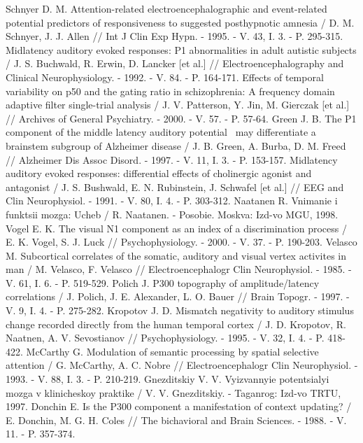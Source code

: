 \documentclass[twocolumn]{article}
\begin{document}
\begin{thebibliography}{35}
Schnyer D. M. Attention-related electroencephalographic and event-related potential predictors of responsiveness to suggested posthypnotic amnesia / D. M. Schnyer, J. J. Allen  // Int J Clin Exp Hypn. - 1995. - V. 43, I. 3. - P. 295-315.
Midlatency auditory evoked responses: P1 abnormalities in adult autistic subjects / J. S. Buchwald, R. Erwin, D. Lancker [et al.] // Electroencephalography and Clinical Neurophysiology. - 1992. - V. 84. - P. 164-171.
Effects of temporal variability on p50 and the gating ratio in schizophrenia: A frequency domain adaptive filter single-trial analysis / J. V. Patterson, Y. Jin, M. Gierczak [et al.] // Archives of General Psychiatry. - 2000. - V. 57. - P. 57-64.
Green J. B. The P1 component of the middle latency auditory potential  may differentiate a brainstem subgroup of Alzheimer disease / J. B. Green, A. Burba, D. M. Freed // Alzheimer Dis Assoc Disord. - 1997. - V. 11, I. 3. - P. 153-157.
Midlatency auditory evoked responses: differential effects of cholinergic agonist and antagonist / J. S. Bushwald, E. N. Rubinstein, J. Schwafel [et al.] // EEG and Clin Neurophysiol. - 1991. - V. 80, I. 4. - P. 303-312.
Naatanen R. Vnimanie i funktsii mozga: Ucheb / R. Naatanen. - Posobie. Moskva: Izd-vo MGU, 1998.
Vogel E. K. The visual N1 component as an index of a discrimination process / E. K. Vogel, S. J. Luck  // Psychophysiology. - 2000. - V. 37. - P. 190-203.
Velasco M. Subcortical correlates of the somatic, auditory and visual vertex activites in man / M. Velasco, F. Velasco  // Electroencephalogr Clin Neurophysiol. - 1985. - V. 61, I. 6. - P. 519-529.
Polich J. P300 topography of amplitude/latency correlations / J. Polich, J. E. Alexander, L. O. Bauer // Brain Topogr. - 1997. - V. 9, I. 4. - P. 275-282.
Kropotov J. D. Mismatch negativity to auditory stimulus change recorded directly from the human temporal cortex / J. D. Kropotov, R. Naatnen, A. V. Sevostianov // Psychophysiology. - 1995. - V. 32, I. 4. - P. 418-422.
McCarthy G. Modulation of semantic processing by spatial selective attention / G. McCarthy, A. C. Nobre  // Electroencephalogr Clin Neurophysiol. - 1993. - V. 88, I. 3. - P. 210-219.
Gnezditskiy V. V. Vyizvannyie potentsialyi mozga v klinicheskoy praktike / V. V. Gnezditskiy. - Taganrog: Izd-vo TRTU, 1997.
Donchin E. Is the P300 component a manifestation of context updating? / E. Donchin, M. G. H. Coles  // The bichavioral and Brain Sciences. - 1988. - V. 11. - P. 357-374.

\end{thebibliography}
\end{document}
